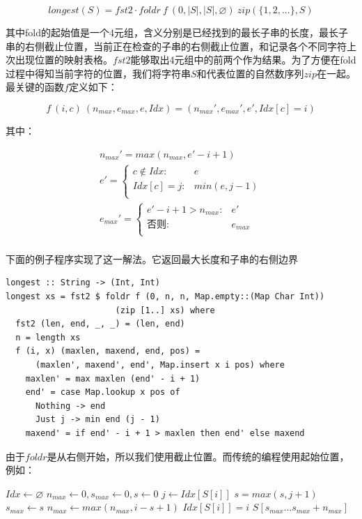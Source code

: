 \documentclass[UTF8]{article}
\begin{document}
\begin{enumerate}
\[
longest(S) = fst2 \cdot foldr\ f\ (0, |S|, |S|, \varnothing)\ zip(\{1, 2, ...\}, S)
\]

其中fold的起始值是一个4元组，含义分别是已经找到的最长子串的长度，最长子串的右侧截止位置，当前正在检查的子串的右侧截止位置，和记录各个不同字符上次出现位置的映射表格。$fst2$能够取出4元组中的前两个作为结果。为了方便在fold过程中得知当前字符的位置，我们将字符串$S$和代表位置的自然数序列$zip$在一起。最关键的函数$f$定义如下：

\[
f\ (i, c)\ (n_{max}, e_{max}, e, Idx) = (n_{max}', e_{max}', e', Idx[c] = i)
\]

其中：

\[ \begin{array}{l}
n_{max}' = max(n_{max}, e' - i + 1) \\
e' = \begin{cases}
  c \notin Idx: & e \\
  Idx[c] = j: & min(e, j - 1) \\
  \end{cases} \\
e_{max}' = \begin{cases}
  e' - i + 1 > n_{max}: & e' \\
  \text{否则}: & e_{max} \\
  \end{cases} \\
\end{array} \]

下面的例子程序实现了这一解法。它返回最大长度和子串的右侧边界

\lstset{frame=single}
\begin{lstlisting}
longest :: String -> (Int, Int)
longest xs = fst2 $ foldr f (0, n, n, Map.empty::(Map Char Int))
                      (zip [1..] xs) where
  fst2 (len, end, _, _) = (len, end)
  n = length xs
  f (i, x) (maxlen, maxend, end, pos) =
      (maxlen', maxend', end', Map.insert x i pos) where
    maxlen' = max maxlen (end' - i + 1)
    end' = case Map.lookup x pos of
      Nothing -> end
      Just j -> min end (j - 1)
    maxend' = if end' - i + 1 > maxlen then end' else maxend
\end{lstlisting}

由于$foldr$是从右侧开始，所以我们使用截止位置。而传统的编程使用起始位置，例如：

\begin{algorithmic}
  \State $Idx \gets \varnothing$
  \State $n_{max} \gets 0, s_{max} \gets 0, s \gets 0$
      \State $j \gets Idx[S[i]]$
      \State $s = max(s, j + 1)$
    \EndIf
      \State $s_{max} \gets s$
    \EndIf
    \State $n_{max} \gets max(n_{max}, i - s + 1)$
    \State $Idx[S[i]] = i$
  \EndFor
  \State \Return $S[s_{max} ... s_{max} + n_{max}]$
\EndFunction
\end{algorithmic}


\end{enumerate}
\end{document}
